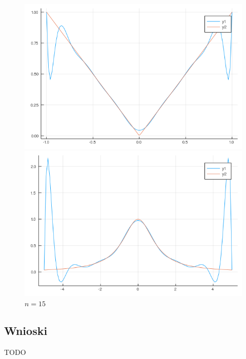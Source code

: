 \documentclass[11pt, a4paper]{article}
\begin{document}
\begin{figure}[H]
        \begin{minipage}{0.5\textwidth}
            \caption{$n=15$}
            \centering
            \includegraphics[width=\linewidth]{plot-6_a_n15}
        \end{minipage}
        \begin{minipage}{0.5\textwidth}
            \caption{$n=15$}
            \centering
            \includegraphics[width=\linewidth]{plot-6_b_n15}
        \end{minipage}
    \end{figure}
    \subsection{Wnioski}


    TODO
\end{document}
